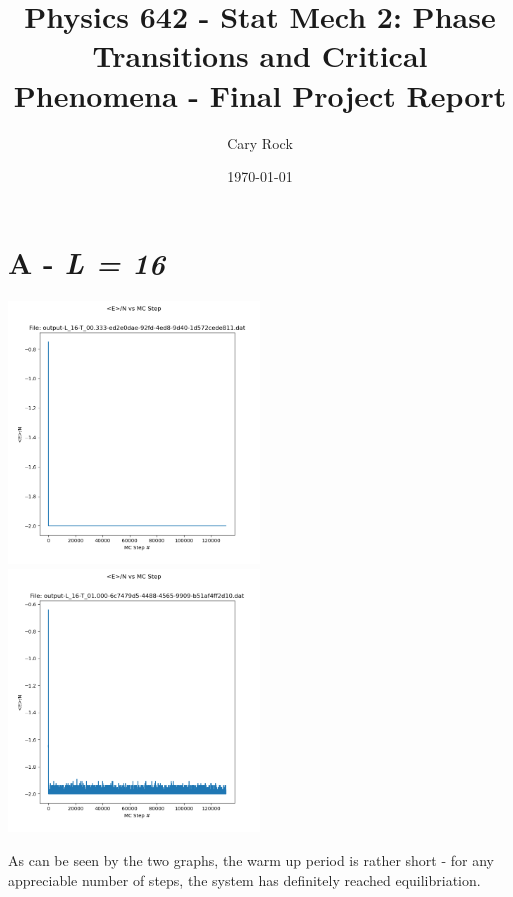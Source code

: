 \documentclass{article}
\title{Physics 642 - Stat Mech 2: Phase Transitions and Critical Phenomena - Final Project Report}
\author{Cary Rock}
\date{\today}
\begin{document}
    \maketitle

    \section{A - \textit{L = 16}}
        \includegraphics[width=0.5\textwidth]{A/A-E-0_333}
        \includegraphics[width=0.5\textwidth]{A/A-E-1_000}
        
        As can be seen by the two graphs, the warm up period is rather short - for any appreciable number of steps, the system has definitely reached equilibriation.
        
\end{document}
